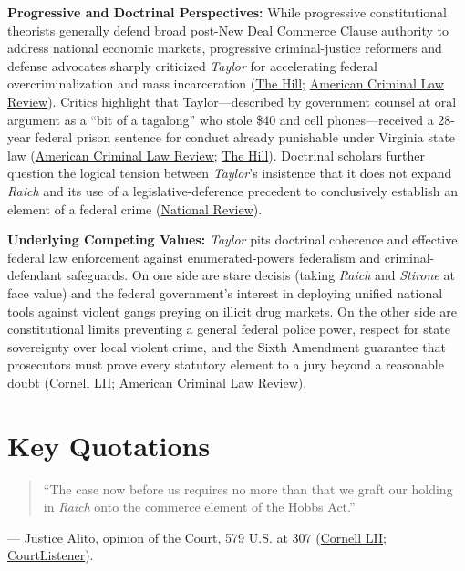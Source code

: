 \documentclass[12pt]{article}
\begin{document}
\textbf{Progressive and Doctrinal Perspectives:} While progressive constitutional theorists generally defend broad post-New Deal Commerce Clause authority to address national economic markets, progressive criminal-justice reformers and defense advocates sharply criticized \textit{Taylor} for accelerating federal overcriminalization and mass incarceration (\href{https://thehill.com/homenews/284991-supreme-courts-hobbs-act-ruling-means-increased-mass-incarceration/}{The Hill}; \href{https://www.law.georgetown.edu/american-criminal-law-review/wp-content/uploads/sites/15/2023/02/53-0-Evola-you-shall-go-no-further.pdf}{American Criminal Law Review}). Critics highlight that Taylor---described by government counsel at oral argument as a ``bit of a tagalong'' who stole \$40 and cell phones---received a 28-year federal prison sentence for conduct already punishable under Virginia state law (\href{https://www.law.georgetown.edu/american-criminal-law-review/wp-content/uploads/sites/15/2023/02/53-0-Evola-you-shall-go-no-further.pdf}{American Criminal Law Review}; \href{https://thehill.com/homenews/284991-supreme-courts-hobbs-act-ruling-means-increased-mass-incarceration/}{The Hill}). Doctrinal scholars further question the logical tension between \textit{Taylor}'s insistence that it does not expand \textit{Raich} and its use of a legislative-deference precedent to conclusively establish an element of a federal crime (\href{https://www.nationalreview.com/bench-memos/loose-evidentiary-ends-raich-taylor-v-united-states}{National Review}).

\textbf{Underlying Competing Values:} \textit{Taylor} pits doctrinal coherence and effective federal law enforcement against enumerated-powers federalism and criminal-defendant safeguards. On one side are stare decisis (taking \textit{Raich} and \textit{Stirone} at face value) and the federal government's interest in deploying unified national tools against violent gangs preying on illicit drug markets. On the other side are constitutional limits preventing a general federal police power, respect for state sovereignty over local violent crime, and the Sixth Amendment guarantee that prosecutors must prove every statutory element to a jury beyond a reasonable doubt (\href{https://www.law.cornell.edu/supremecourt/text/14-6166}{Cornell LII}; \href{https://www.law.georgetown.edu/american-criminal-law-review/wp-content/uploads/sites/15/2023/02/53-0-Evola-you-shall-go-no-further.pdf}{American Criminal Law Review}).

\section{Key Quotations}
\begin{quote}
``The case now before us requires no more than that we graft our holding in \textit{Raich} onto the commerce element of the Hobbs Act.''
\end{quote}
\noindent--- Justice Alito, opinion of the Court, 579 U.S. at 307 (\href{https://www.law.cornell.edu/supremecourt/text/14-6166}{Cornell LII}; \href{https://www.courtlistener.com/opinion/3214883/taylor-v-united-states/}{CourtListener}).
\end{document}
